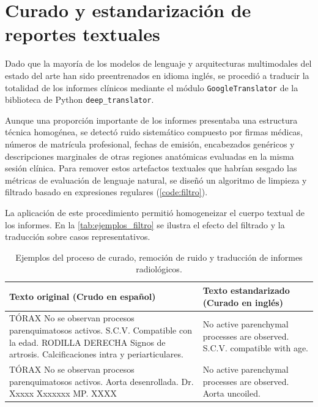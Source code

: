 \documentclass[../tesis.tex]{subfiles}
\begin{document}
\section{Curado y estandarización de reportes textuales}

Dado que la mayoría de los modelos de lenguaje y arquitecturas multimodales del estado del arte han sido preentrenados en idioma inglés, se procedió a traducir la totalidad de los informes clínicos mediante el módulo \texttt{GoogleTranslator} de la biblioteca de Python \texttt{deep\_translator}.

Aunque una proporción importante de los informes presentaba una estructura técnica homogénea, se detectó ruido sistemático compuesto por firmas médicas, números de matrícula profesional, fechas de emisión, encabezados genéricos y descripciones marginales de otras regiones anatómicas evaluadas en la misma sesión clínica. Para remover estos artefactos textuales que habrían sesgado las métricas de evaluación de lenguaje natural, se diseñó un algoritmo de limpieza y filtrado basado en expresiones regulares (\autoref{code:filtro}).


La aplicación de este procedimiento permitió homogeneizar el cuerpo textual de los informes. En la \autoref{tab:ejemplos_filtro} se ilustra el efecto del filtrado y la traducción sobre casos representativos.

\begin{table}[htbp]
    \centering
    \small
    \begin{tabular}{|p{7cm}|p{7.5cm}|}
        \hline
        \textbf{Texto original (Crudo en español)} & \textbf{Texto estandarizado (Curado en inglés)} \\ \hline
        TÓRAX \newline No se observan procesos parenquimatosos activos. \newline S.C.V. Compatible con la edad. \newline \newline RODILLA DERECHA \newline Signos de artrosis. Calcificaciones intra y periarticulares. & No active parenchymal processes are observed. S.C.V. compatible with age. \\ \hline
        TÓRAX \newline No se observan procesos parenquimatosos activos. \newline Aorta desenrollada. \newline \newline Dr. Xxxxx Xxxxxxx \newline MP. XXXX & No active parenchymal processes are observed. Aorta uncoiled. \\ \hline
    \end{tabular}
    \caption{Ejemplos del proceso de curado, remoción de ruido y traducción de informes radiológicos.}
    \label{tab:ejemplos_filtro}
\end{table}
\end{document}
